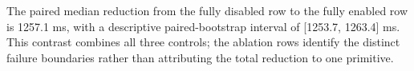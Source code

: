 The paired median reduction from the fully disabled row to the fully enabled row is 1257.1 ms, with a descriptive paired-bootstrap interval of [1253.7, 1263.4] ms. This contrast combines all three controls; the ablation rows identify the distinct failure boundaries rather than attributing the total reduction to one primitive.
